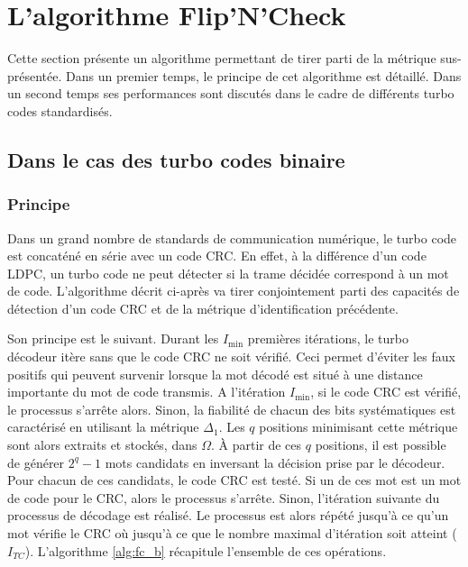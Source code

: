 \section{L'algorithme Flip'N'Check}
Cette section présente un algorithme permettant de tirer parti de la métrique sus-présentée.
Dans un premier temps, le principe de cet algorithme est détaillé. Dans un second temps ses performances sont discutés 
dans le cadre de différents turbo codes standardisés.
\subsection{Dans le cas des turbo codes binaire}

\subsubsection{Principe}
Dans un grand nombre de standards de communication numérique, le turbo code est concaténé en série avec un code CRC. En 
effet, à la différence d'un code LDPC, un turbo code ne peut détecter si la trame décidée correspond à un mot de code. 
L'algorithme  décrit ci-après va tirer conjointement parti des capacités de détection d'un code CRC et de la métrique 
d'identification précédente. 

Son principe est le suivant. Durant les $I_{\text{min}}$ premières itérations, le turbo décodeur itère sans que le code
CRC ne soit vérifié. Ceci permet d'éviter les faux positifs qui peuvent survenir lorsque la mot décodé est situé à une 
distance importante du mot de code transmis. A l'itération $I_{\text{min}}$, si le code CRC est vérifié, le processus
s'arrête alors. Sinon, la fiabilité de chacun des bits systématiques est caractérisé en utilisant la métrique $\Delta_1$.
Les $q$ positions minimisant cette métrique sont alors extraits et stockés, dans $\Omega$. À partir de ces $q$ positions,
il est possible de générer $2^q-1$ mots candidats en inversant la décision prise par le décodeur. Pour chacun de ces 
candidats, le code CRC est testé. Si un de ces mot est un mot de code pour le CRC, alors le processus s'arrête. Sinon, 
l'itération suivante du processus de décodage est réalisé. Le processus est alors répété jusqu'à ce qu'un mot vérifie le 
CRC où jusqu'à ce que le nombre maximal d'itération soit atteint ($I_{TC}$). L'algorithme \ref{alg:fc_b} récapitule l'ensemble de 
ces opérations.

